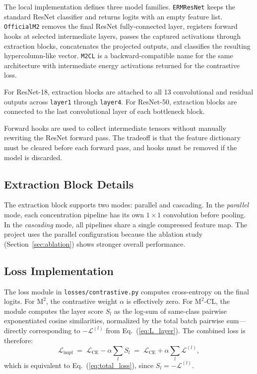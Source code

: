 \documentclass[11pt,a4paper]{article}
\newcommand{\method}{\texorpdfstring{$\mathrm{M}^2$\textup{-CL}}{M2-CL}}
\newcommand{\base}{\texorpdfstring{$\mathrm{M}^2$}{M2}}
\newcommand{\codepath}[1]{\texttt{\small #1}}
\newcommand{\Lcal}{\mathcal{L}}
\begin{document}
The local implementation defines three model families.
\codepath{ERMResNet} keeps the standard ResNet classifier and returns logits with
an empty feature list.
\codepath{OfficialM2} removes the final ResNet fully-connected layer, registers
forward hooks at selected intermediate layers, passes the captured activations
through extraction blocks, concatenates the projected outputs, and classifies the
resulting hypercolumn-like vector.
\codepath{M2CL} is a backward-compatible name for the same architecture with
intermediate energy activations returned for the contrastive loss.

For ResNet-18, extraction blocks are attached to all 13 convolutional and
residual outputs across \codepath{layer1} through \codepath{layer4}.  For
ResNet-50, extraction blocks are connected to the last convolutional layer of
each bottleneck block.

Forward hooks are used to collect intermediate tensors without manually rewriting
the ResNet forward pass.  The tradeoff is that the feature dictionary must be
cleared before each forward pass, and hooks must be removed if the model is
discarded.

\subsection{Extraction Block Details}

The extraction block supports two modes: parallel and cascading.  In the
\emph{parallel} mode, each concentration pipeline has its own $1{\times}1$
convolution before pooling.  In the \emph{cascading} mode, all pipelines share a
single compressed feature map.  The project uses the parallel configuration
because the ablation study (Section~\ref{sec:ablation}) shows stronger overall
performance.

\subsection{Loss Implementation}
\label{sec:loss_impl}

The loss module in \codepath{losses/contrastive.py} computes cross-entropy on the
final logits.  For \base{}, the contrastive weight $\alpha$ is effectively zero.
For \method{}, the module computes the layer score $S_l$ as the log-sum of
same-class pairwise exponentiated cosine similarities, normalized by the total
batch pairwise sum—directly corresponding to $-\Lcal^{(l)}$ from
Eq.~(\ref{eq:L_layer}).  The combined loss is therefore:
\begin{equation}
  \Lcal_{\mathrm{impl}}
  \;=\;
  \Lcal_{\mathrm{CE}} - \alpha \sum_l S_l
  \;=\;
  \Lcal_{\mathrm{CE}} + \alpha \sum_l \Lcal^{(l)},
\end{equation}
which is equivalent to Eq.~(\ref{eq:total_loss}), since $S_l = -\Lcal^{(l)}$.
\end{document}
